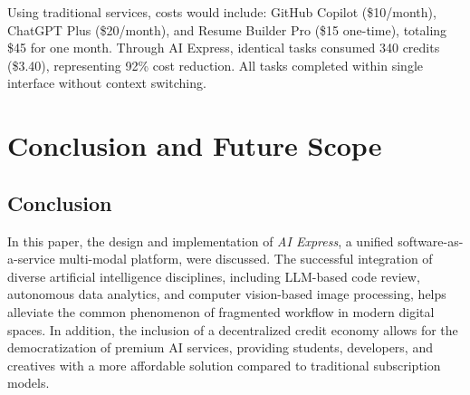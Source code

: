 \documentclass[conference]{IEEEtran}
\begin{document}
Using traditional services, costs would include: GitHub Copilot (\$10/month), ChatGPT Plus (\$20/month), and Resume Builder Pro (\$15 one-time), totaling \$45 for one month. Through AI Express, identical tasks consumed 340 credits (\$3.40), representing 92\% cost reduction. All tasks completed within single interface without context switching.

\section{Conclusion and Future Scope}

\subsection{Conclusion}
In this paper, the design and implementation of \textit{AI Express}, a unified software-as-a-service multi-modal platform, were discussed. The successful integration of diverse artificial intelligence disciplines, including LLM-based code review, autonomous data analytics, and computer vision-based image processing, helps alleviate the common phenomenon of fragmented workflow in modern digital spaces. In addition, the inclusion of a decentralized credit economy allows for the democratization of premium AI services, providing students, developers, and creatives with a more affordable solution compared to traditional subscription models.
\end{document}
